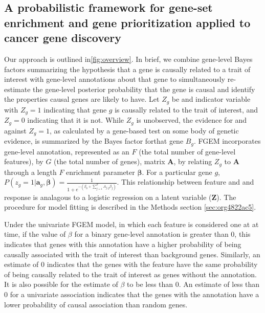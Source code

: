 \subsection{A probabilistic framework for gene-set enrichment and gene prioritization applied to cancer gene discovery}\label{sec:org2d4ff20}

Our approach is outlined in\ref{fig:overview}. In brief, we combine gene-level Bayes factors summarizing the hypothesis that a gene is causally related to a trait of interest with gene-level annotations about that gene to simultaneously re-estimate the gene-level posterior probability that the gene is causal and identify the properties causal genes are likely to have.  Let $Z_g$ be and indicator variable with $Z_g = 1$ indicating that gene $g$ is causally related to the trait of interest, and $Z_g = 0$ indicating that it is not.  While $Z_g$ is unobserved, the evidence for and against $Z_g=1$, as calculated by a gene-based test on some body of genetic evidence, is summarized by the Bayes factor forthat gene $B_g$.  FGEM incorporates gene-level annotation, represented as an $F$ (the total number of gene-level features), by $G$ (the total number of genes), matrix $\textbf{A}$, by relating $Z_g$ to $\textbf{A}$ through a length $F$  enrichment parameter $\boldsymbol{\beta}$.  For a particular gene $g$, $P(z_g=1|\textbf{a}_g,\boldsymbol{\beta}) =  \frac{1}{1+e^{-(\beta_{0}+\sum_{f=1}^F{A_{f,g}\beta_f})}} $.  This relationship between feature and and response is
analagous to a logistic regression on a latent variable ($\textbf{Z}$).  The procedure for model fitting is described in the Methods section \ref{sec:org4822ac5}.

Under the univariate FGEM model, in which each feature is considered one at at time, if the value of $\beta$ for a binary gene-level annotation is greater than $0$, this indicates that genes with this annotation have a higher probability of being causally associated with the trait of interest than background genes.  Similarly, an estimate of $0$ indicates that the genes with the feature have the same probability of being causally related to the trait of interest as genes without the annotation.  It is also possible for the estimate of $\beta$ to be less than $0$.  An estimate of less than 0 for a univariate association indicates that the genes with the annotation have a lower probability of causal association than random genes.

